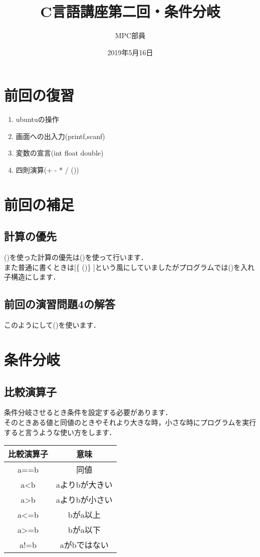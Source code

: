 \documentclass[a4j,titlepage,dvipdfmx]{jsarticle}   %
\title{C言語講座第二回・条件分岐}
\author{MPC部員}
\date{2019年5月16日}
\begin{document}
\maketitle
\section{前回の復習}
\begin{enumerate}
\item ubuntuの操作
\item 画面への出入力(printf,scanf)
\item 変数の宣言(int float double)
\item 四則演算(+ - * / ())
\end{enumerate}
\section{前回の補足}
\subsection{計算の優先}
()を使った計算の優先は()を使って行います．\\
また普通に書くときは[\{ ()\} ]という風にしていましたがプログラムでは()を入れ子構造にします．\\
\subsection{前回の演習問題4の解答}

このようにして()を使います．
\section{条件分岐}
\subsection{比較演算子}
条件分岐させるとき条件を設定する必要があります．\\
そのときある値と同値のときやそれより大きな時，小さな時にプログラムを実行すると言うような使い方をします．
\begin{table}[h]
\begin{tabular}{|c|c|}
\hline
比較演算子 & 意味 \\ \hline
a==b & 同値 \\ \hline
a\textless{}b & aよりbが大きい \\ \hline
a\textgreater{}b & aよりbが小さい \\ \hline
a\textless{}=b & bがa以上 \\ \hline
a\textgreater{}=b & bがa以下 \\ \hline
a!=b & aがbではない \\ \hline
\end{tabular}
\end{table}
\end{document}
